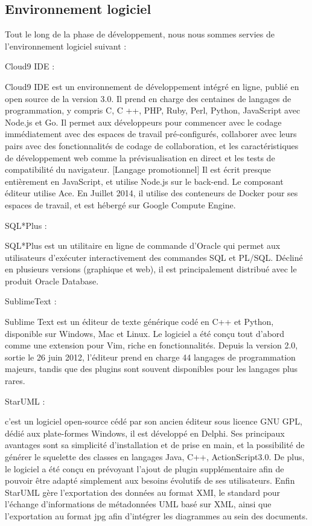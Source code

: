 \subsection{Environnement logiciel}
Tout le long de la phase de développement, nous nous sommes servies de l’environnement
logiciel suivant :\\
\begin{description}

{\bf \item Cloud9 IDE :} 
Cloud9 IDE est un environnement de développement intégré en ligne, publié en open source de la version 3.0. Il prend en charge des centaines de langages de programmation, y compris C, C ++, PHP, Ruby, Perl, Python, JavaScript avec Node.js et Go. Il permet aux développeurs pour commencer avec le codage immédiatement avec des espaces de travail pré-configurés, collaborer avec leurs pairs avec des fonctionnalités de codage de collaboration, et les caractéristiques de développement web comme la prévisualisation en direct et les tests de compatibilité du navigateur. [Langage promotionnel]
Il est écrit presque entièrement en JavaScript, et utilise Node.js sur le back-end. Le composant éditeur utilise Ace. En Juillet 2014, il utilise des conteneurs de Docker pour ses espaces de travail, et est hébergé sur Google Compute Engine.
{\bf \item SQL*Plus : }SQL*Plus est un utilitaire en ligne de commande d'Oracle qui permet aux utilisateurs d'exécuter interactivement des commandes SQL et PL/SQL. Décliné en plusieurs versions (graphique et web), il est principalement distribué avec le produit Oracle Database.
{\bf \item SublimeText : }
Sublime Text est un éditeur de texte générique codé en C++ et Python, disponible sur Windows, Mac et Linux. Le logiciel a été conçu tout d'abord comme une extension pour Vim, riche en fonctionnalités.
Depuis la version 2.0, sortie le 26 juin 2012, l'éditeur prend en charge 44 langages de programmation majeurs, tandis que des plugins sont souvent disponibles pour les langages plus rares.
{\bf \item StarUML : }
c'est un logiciel open-source cédé par son ancien éditeur sous licence GNU GPL, dédié aux plate-formes Windows, il est développé en Delphi. Ses principaux avantages
sont sa simplicité d’installation et de prise en main, et la possibilité de générer le squelette
des classes en langages Java, C++, ActionScript3.0. De plus, le logiciel a été conçu en prévoyant l’ajout de plugin supplémentaire afin de pouvoir être adapté simplement aux besoins évolutifs de ses utilisateurs. Enfin StarUML gère l’exportation des données au format XMI, le standard pour l’échange d’informations de métadonnées UML basé sur XML, ainsi que l’exportation au format jpg afin d’intégrer les diagrammes au sein des  documents.

\end{description}
